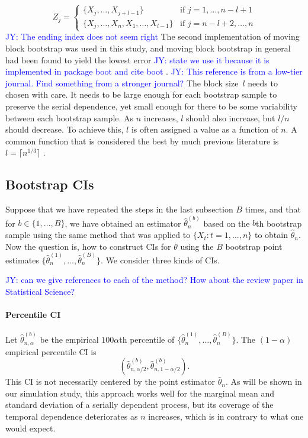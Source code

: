 \documentclass[12pt, letterpaper, titlepage]{article}
\newcommand{\jy}[1]{\textcolor{blue}{JY: #1}}
\begin{document}
\begin{equation}
Z_j =
    \begin{cases}
        \{X_j, \ldots, X_{j + l - 1}\} & \text{if } j = 1, \dots, n - l + 1\\
        \{X_j, \ldots, X_n, X_1, \ldots, X_{l - 1}\} & \text{if } j = n - l + 2 ,\dots, n
    \end{cases}
\end{equation}
\jy{The ending index does not seem right}
The second implementation of moving block bootstrap was used in
this study, and moving block bootstrap in general had been found to yield the 
lowest error \jy{state we use it because it is implemented in package boot and
  cite boot}
\citep{radovanov2014comparison}.  
\jy{This reference is from a low-tier journal. Find something from a stronger journal?}
The block size~$l$ needs to chosen with care. It needs to be large enough for
each bootstrap sample to preserve the serial dependence, yet small enough for
there to be some variability between each bootstrap sample. As $n$ increases,
$l$ should also increase, but $l / n$ should decrease. To achieve this, $l$ is
often assigned a value as a function of $n$. A common function that is
considered the best by much previous literature is $l = \lceil n^{1/3} \rceil$
\citep{buhlmann1999block}.


\subsection{Bootstrap CIs}

Suppose that we have repeated the steps in the last subsection $B$ times, and
that for $b \in \{1, \ldots, B\}$, we have obtained an estimator
$\hat\theta_n^{(b)}$ based on the $b$th bootstrap sample using the same method
that was applied to $\{X_t: t = 1, \ldots, n\}$ to obtain $\hat\theta_n$.
Now the question is, how to construct CIs for $\theta$
using the $B$ bootstrap point estimates
$\{\hat\theta_n^{(1)}, \ldots, \hat\theta_n^{(B)}\}$.
We consider three kinds of CIs.

\jy{can we give references to each of the method? How about the review paper in
  Statistical Science?}


\paragraph{Percentile CI}
Let $\hat\theta_{n, \alpha}^{(b)}$ be the empirical $100\alpha$th percentile of
$\{\hat\theta_n^{(1)}, \ldots, \hat\theta_n^{(B)}\}$. The $(1 - \alpha)$
empirical percentile CI is
\[
(\hat\theta_{n, \alpha/2}^{(b)}, \hat\theta_{n, 1 - \alpha/2}^{(b)}).
\]
This CI is not necessarily centered by the point estimator $\hat\theta_n$.
As will be shown in our simulation study, this approach works well for the
marginal mean and standard deviation of a serially dependent process, but its
coverage of the temporal dependence deteriorates as $n$ increases, which is in
contrary to what one would expect.
\end{document}
